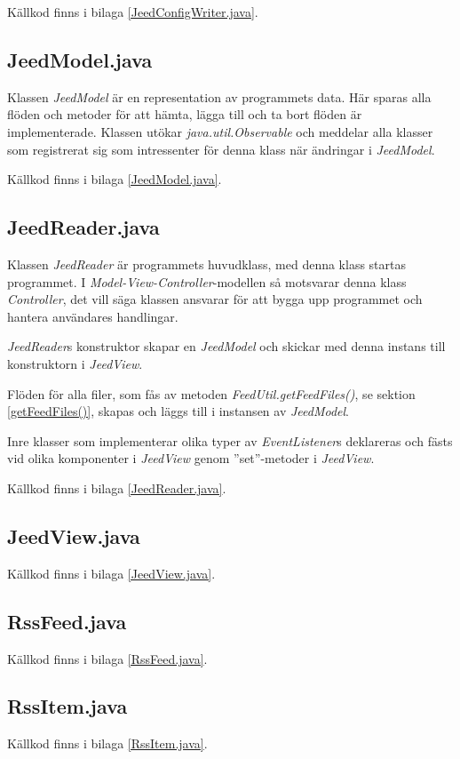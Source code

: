 \documentclass[a4paper, 12pt]{article}
\begin{document}
Källkod finns i bilaga \ref{JeedConfigWriter.java}.

\subsection{JeedModel.java}\label{JeedModel}
Klassen \textit{JeedModel} är en representation av programmets
data. Här sparas alla flöden och metoder för att hämta, lägga till och
ta bort flöden är implementerade. Klassen utökar
\textit{java.util.Observable} och meddelar alla klasser som
registrerat sig som intressenter för denna klass när ändringar i
\textit{JeedModel}.

Källkod finns i bilaga \ref{JeedModel.java}.

\subsection{JeedReader.java}\label{JeedReader}
Klassen \textit{JeedReader} är programmets huvudklass, med denna klass
startas programmet. I \textit{Model-View-Controller}-modellen så
motsvarar denna klass \textit{Controller}, det vill säga klassen
ansvarar för att bygga upp programmet och hantera användares
handlingar.

\textit{JeedReader}s konstruktor skapar en \textit{JeedModel} och
skickar med denna instans till konstruktorn i \textit{JeedView}.

Flöden för alla filer, som fås av metoden
\textit{FeedUtil.getFeedFiles()}, se sektion \ref{getFeedFiles()},
skapas och läggs till i instansen av \textit{JeedModel}.

Inre klasser som implementerar olika typer av \textit{EventListener}s
deklareras och fästs vid olika komponenter i \textit{JeedView} genom
''set''-metoder i \textit{JeedView}.

Källkod finns i bilaga \ref{JeedReader.java}.

\subsection{JeedView.java}\label{JeedView}
Källkod finns i bilaga \ref{JeedView.java}.
\subsection{RssFeed.java}\label{RssFeed}
Källkod finns i bilaga \ref{RssFeed.java}.
\subsection{RssItem.java}\label{RssItem}
Källkod finns i bilaga \ref{RssItem.java}.
\end{document}
